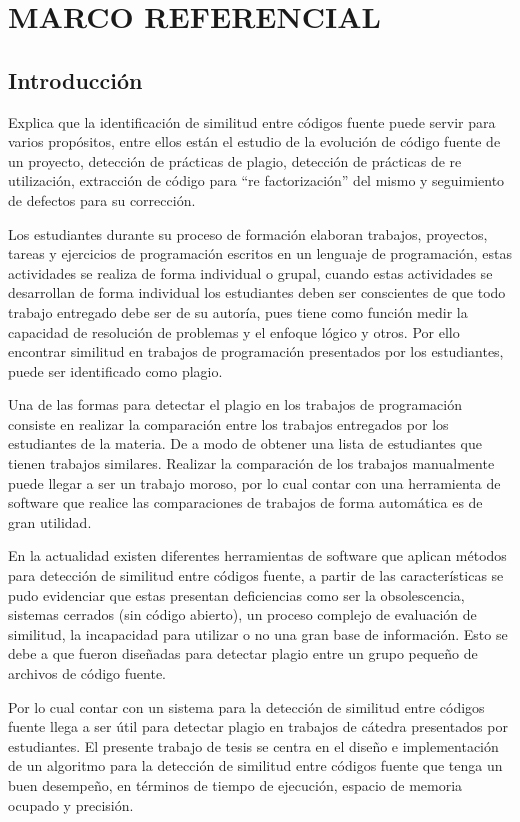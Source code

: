 \chapter{MARCO REFERENCIAL}

\section{Introducción}
\cite{unknown1} Explica que la identificación de similitud entre códigos fuente puede servir para varios propósitos, entre ellos están el estudio de la evolución de código fuente de un proyecto, detección de prácticas de plagio, detección de prácticas de re utilización, extracción de código para “re factorización” del mismo y seguimiento de defectos para su corrección.

Los estudiantes durante su proceso de formación elaboran trabajos, proyectos, tareas y ejercicios de programación escritos en un lenguaje de programación, estas actividades se realiza de forma individual o grupal, cuando estas actividades se desarrollan de forma individual los estudiantes deben ser conscientes de que todo trabajo entregado debe ser de su autoría, pues tiene como función medir la capacidad de resolución de problemas y el enfoque lógico y otros. Por ello encontrar similitud en trabajos de programación presentados por los estudiantes, puede ser identificado como plagio.

Una de las formas para detectar el plagio en los trabajos de programación consiste en realizar la comparación entre los trabajos entregados por los estudiantes de la materia. De a modo de obtener una lista de estudiantes que tienen trabajos similares. Realizar la comparación de los trabajos manualmente puede llegar a ser un trabajo moroso, por lo cual contar con una herramienta de software que realice las comparaciones de trabajos de forma automática es de gran utilidad.

En la actualidad existen diferentes herramientas de software que aplican métodos para detección de similitud entre códigos fuente, a partir de las características se pudo evidenciar que estas presentan deficiencias como ser la obsolescencia, sistemas cerrados (sin código abierto), un proceso complejo de evaluación de similitud, la incapacidad para utilizar o no una gran base de información. Esto se debe a que fueron diseñadas para detectar plagio entre un grupo pequeño de archivos de código fuente.

Por lo cual contar con un sistema para la detección de similitud entre códigos fuente llega a ser útil para detectar plagio en trabajos de cátedra presentados por estudiantes. El presente trabajo de tesis se centra en el diseño e implementación de un algoritmo para la detección de similitud entre códigos fuente que tenga un buen desempeño, en términos de tiempo de ejecución, espacio de memoria ocupado y precisión.
